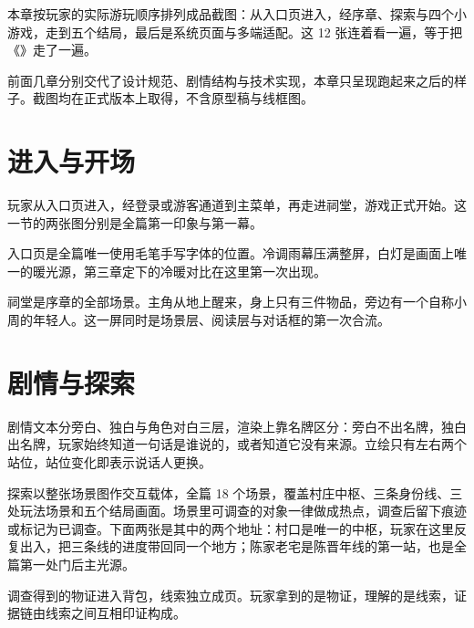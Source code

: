 本章按玩家的实际游玩顺序排列成品截图：从入口页进入，经序章、探索与四个小游戏，走到五个结局，最后是系统页面与多端适配。这 12 张连着看一遍，等于把《\ProjectName》走了一遍。

前面几章分别交代了设计规范、剧情结构与技术实现，本章只呈现跑起来之后的样子。截图均在正式版本上取得，不含原型稿与线框图。

\section{进入与开场}

玩家从入口页进入，经登录或游客通道到主菜单，再走进祠堂，游戏正式开始。这一节的两张图分别是全篇第一印象与第一幕。

入口页是全篇唯一使用毛笔手写字体的位置。冷调雨幕压满整屏，白灯是画面上唯一的暖光源，第三章定下的冷暖对比在这里第一次出现。


祠堂是序章的全部场景。主角从地上醒来，身上只有三件物品，旁边有一个自称小周的年轻人。这一屏同时是场景层、阅读层与对话框的第一次合流。


\section{剧情与探索}

剧情文本分旁白、独白与角色对白三层，渲染上靠名牌区分：旁白不出名牌，独白出名牌，玩家始终知道一句话是谁说的，或者知道它没有来源。立绘只有左右两个站位，站位变化即表示说话人更换。


探索以整张场景图作交互载体，全篇 18 个场景，覆盖村庄中枢、三条身份线、三处玩法场景和五个结局画面。场景里可调查的对象一律做成热点，调查后留下痕迹或标记为已调查。下面两张是其中的两个地址：村口是唯一的中枢，玩家在这里反复出入，把三条线的进度带回同一个地方；陈家老宅是陈晋年线的第一站，也是全篇第一处门后主光源。



调查得到的物证进入背包，线索独立成页。玩家拿到的是物证，理解的是线索，证据链由线索之间互相印证构成。

